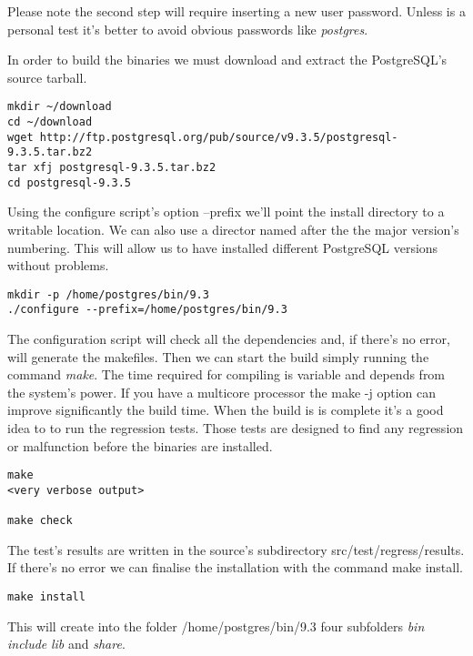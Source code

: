 Please note the second step will require inserting a new user password. Unless is a personal
test it's better to avoid obvious passwords like \textit{postgres}.\newline

In order to build the binaries we must download and extract the PostgreSQL's source tarball.

\begin{verbatim}
mkdir ~/download
cd ~/download
wget http://ftp.postgresql.org/pub/source/v9.3.5/postgresql-9.3.5.tar.bz2
tar xfj postgresql-9.3.5.tar.bz2
cd postgresql-9.3.5
\end{verbatim}


Using the configure script's option --prefix we'll point the install directory to a writable
location. We can also use a director named after the the major version's numbering. This will allow
us to have installed different PostgreSQL versions without problems.

\begin{verbatim}
mkdir -p /home/postgres/bin/9.3
./configure --prefix=/home/postgres/bin/9.3
\end{verbatim}

The configuration script will check all the dependencies and, if there's no error, will generate 
the makefiles. Then we can start the build simply running the command \textit{make}. The time
required for compiling is variable and depends from the system's power. If you have a multicore
processor the make -j option can improve significantly the build time. When the build is is complete
it's a good idea to to run the regression tests. Those tests are designed to find any regression or
malfunction before the binaries are installed.

\begin{verbatim}
make
<very verbose output>

make check 

\end{verbatim}

The test's results are written in the source's subdirectory src/test/regress/results. If
there's no error we can finalise the installation with the command make install.

\begin{verbatim}
make install
\end{verbatim}

This will create into the folder /home/postgres/bin/9.3 four subfolders \textit{bin} 
\textit{include} \textit{lib} and \textit{share}.

